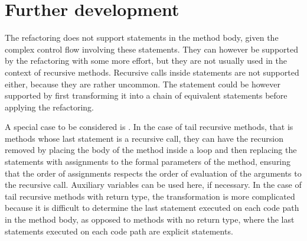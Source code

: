 \chapter{Further development}

The refactoring does not support  statements in the method body, given the complex control flow involving
these statements. They can however be supported by the refactoring with some more effort, but they are not usually used
in the context of recursive methods. Recursive calls inside  statements are not supported either, because
they are rather uncommon. The  statement could be however supported by first transforming it into a chain
of equivalent  statements before applying the refactoring.

A special case to be considered is . In the case of tail recursive methods, that is methods
whose last statement is a recursive call, they can have the recursion removed by placing the body of the method inside a
 loop and then replacing the  statements with assignments to the formal parameters of the
method, ensuring that the order of assignments respects the order of evaluation of the arguments to the recursive call.
Auxiliary variables can be used here, if necessary. In the case of tail recursive methods with  return type,
the transformation is more complicated because it is difficult to determine the last statement executed on each code
path in the method body, as opposed to methods with no  return type, where the last statements executed on
each code path are explicit  statements.
